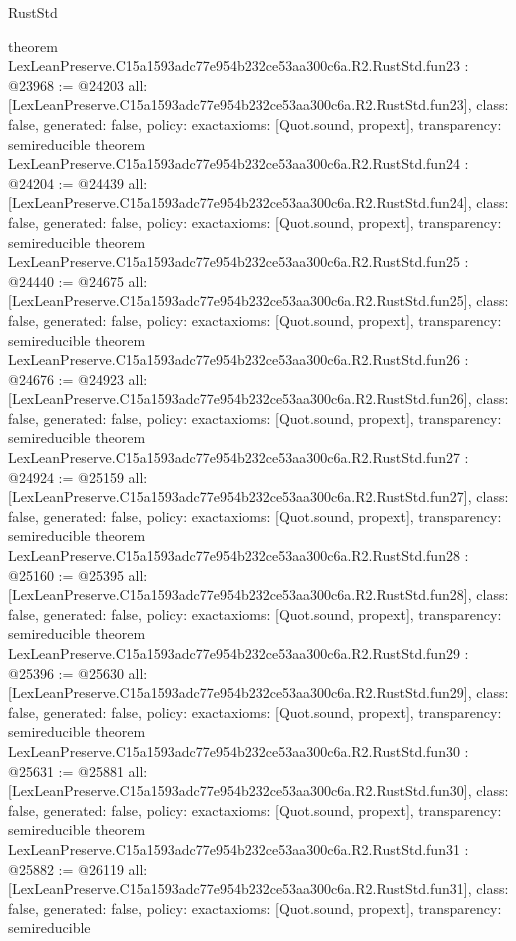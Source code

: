 \begin{lexlean}{RustStd}
\begin{coremodule}
{}
theorem LexLeanPreserve.C15a1593adc77e954b232ce53aa300c6a.R2.RustStd.fun23 : @23968 := @24203 {
  all: [LexLeanPreserve.C15a1593adc77e954b232ce53aa300c6a.R2.RustStd.fun23],
  class: false,
  generated: false,
  policy: exact{axioms: [Quot.sound, propext]},
  transparency: semireducible
}
theorem LexLeanPreserve.C15a1593adc77e954b232ce53aa300c6a.R2.RustStd.fun24 : @24204 := @24439 {
  all: [LexLeanPreserve.C15a1593adc77e954b232ce53aa300c6a.R2.RustStd.fun24],
  class: false,
  generated: false,
  policy: exact{axioms: [Quot.sound, propext]},
  transparency: semireducible
}
theorem LexLeanPreserve.C15a1593adc77e954b232ce53aa300c6a.R2.RustStd.fun25 : @24440 := @24675 {
  all: [LexLeanPreserve.C15a1593adc77e954b232ce53aa300c6a.R2.RustStd.fun25],
  class: false,
  generated: false,
  policy: exact{axioms: [Quot.sound, propext]},
  transparency: semireducible
}
theorem LexLeanPreserve.C15a1593adc77e954b232ce53aa300c6a.R2.RustStd.fun26 : @24676 := @24923 {
  all: [LexLeanPreserve.C15a1593adc77e954b232ce53aa300c6a.R2.RustStd.fun26],
  class: false,
  generated: false,
  policy: exact{axioms: [Quot.sound, propext]},
  transparency: semireducible
}
theorem LexLeanPreserve.C15a1593adc77e954b232ce53aa300c6a.R2.RustStd.fun27 : @24924 := @25159 {
  all: [LexLeanPreserve.C15a1593adc77e954b232ce53aa300c6a.R2.RustStd.fun27],
  class: false,
  generated: false,
  policy: exact{axioms: [Quot.sound, propext]},
  transparency: semireducible
}
theorem LexLeanPreserve.C15a1593adc77e954b232ce53aa300c6a.R2.RustStd.fun28 : @25160 := @25395 {
  all: [LexLeanPreserve.C15a1593adc77e954b232ce53aa300c6a.R2.RustStd.fun28],
  class: false,
  generated: false,
  policy: exact{axioms: [Quot.sound, propext]},
  transparency: semireducible
}
theorem LexLeanPreserve.C15a1593adc77e954b232ce53aa300c6a.R2.RustStd.fun29 : @25396 := @25630 {
  all: [LexLeanPreserve.C15a1593adc77e954b232ce53aa300c6a.R2.RustStd.fun29],
  class: false,
  generated: false,
  policy: exact{axioms: [Quot.sound, propext]},
  transparency: semireducible
}
theorem LexLeanPreserve.C15a1593adc77e954b232ce53aa300c6a.R2.RustStd.fun30 : @25631 := @25881 {
  all: [LexLeanPreserve.C15a1593adc77e954b232ce53aa300c6a.R2.RustStd.fun30],
  class: false,
  generated: false,
  policy: exact{axioms: [Quot.sound, propext]},
  transparency: semireducible
}
theorem LexLeanPreserve.C15a1593adc77e954b232ce53aa300c6a.R2.RustStd.fun31 : @25882 := @26119 {
  all: [LexLeanPreserve.C15a1593adc77e954b232ce53aa300c6a.R2.RustStd.fun31],
  class: false,
  generated: false,
  policy: exact{axioms: [Quot.sound, propext]},
  transparency: semireducible
}
\end{coremodule}
\end{lexlean}
